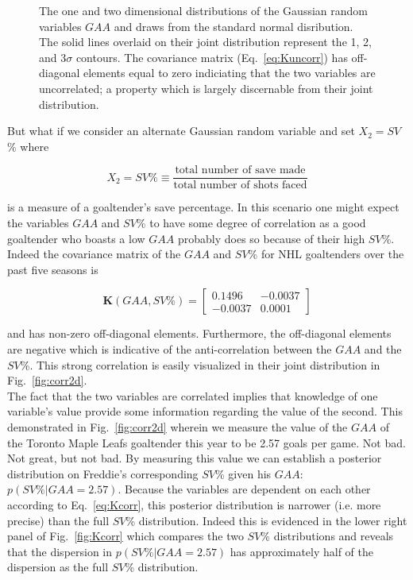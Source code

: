 \begin{figure}
  \centering
  \caption{The one and two dimensional distributions of the Gaussian random
    variables $GAA$ and draws from the standard normal disribution. The solid
    lines overlaid on their joint distribution represent the 1, 2, and 3$\sigma$
    contours. The covariance matrix (Eq.~\ref{eq:Kuncorr}) has off-diagonal
    elements equal to zero indiciating that the two variables are uncorrelated;
    a property which is largely discernable from their joint distribution.}
  \label{fig:uncorr2d}
\end{figure}

But what if we consider an alternate Gaussian random variable and set
$X_2 = SV$\% where

\begin{equation}
  X_2 = SV\% \equiv \frac{\text{total number of save made}}{\text{total number of shots faced}}
\end{equation}

\noindent is a measure of a goaltender's save percentage. In this scenario one
might expect the variables $GAA$ and $SV$\% to have some degree of correlation
as a good goaltender who boasts a low $GAA$ probably does so because of their
high $SV$\%. Indeed the covariance matrix of the $GAA$ and $SV$\% for NHL
goaltenders over the past five seasons is

\begin{equation}
  \mathbf{K}(GAA,SV\%) =
  \begin{bmatrix}
    0.1496 & -0.0037 \\
    -0.0037 & 0.0001
  \end{bmatrix}
  \label{eq:Kcorr}
\end{equation}

\noindent and has non-zero off-diagonal elements. Furthermore, the off-diagonal
elements are negative which is indicative of the anti-correlation between the
$GAA$ and the $SV$\%. This strong correlation is easily visualized in their joint
distribution in Fig.~\ref{fig:corr2d}. \\

The fact that the two variables are
correlated implies that knowledge of one variable's value provide some information
regarding the value of the second. This demonstrated in Fig.~\ref{fig:corr2d}
wherein we measure the value of the $GAA$ of the Toronto Maple Leafs goaltender
this year to be 2.57 goals per game. Not bad. Not great, but not bad. By measuring
this value we can establish a posterior distribution on Freddie's corresponding
$SV$\% given his $GAA$: $p(SV\%|GAA=2.57)$. Because the variables are dependent
on each other according to Eq.~\ref{eq:Kcorr}, this posterior distribution is
narrower (i.e. more precise) than the full $SV$\% distribution. Indeed this is
evidenced in the lower right panel of Fig.~\ref{fig:Kcorr} which compares the
two $SV$\% distributions and reveals that the dispersion in $p(SV\%|GAA=2.57)$
has approximately half of the dispersion as the full $SV$\% distribution. \\

